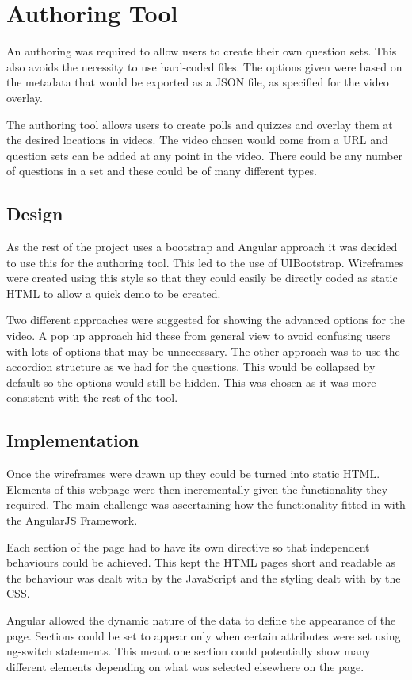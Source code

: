 \chapter{Authoring Tool} 
\label{Chapter:Authoring Tool}
An \gls{authoring} was required to allow users to create their own question sets. This also avoids the necessity to use hard-coded files. The options given were based on the metadata that would be exported as a JSON file, as specified for the video overlay.

The authoring tool allows users to create polls and quizzes and overlay them at the desired locations in videos. The video chosen would come from a URL and question sets can be added at any point in the video. There could be any number of questions in a set and these could be of many different types.
\section{Design} 
\label{Section:Design}
As the rest of the project uses a bootstrap and Angular approach it was decided to use this for the authoring tool. This led to the use of UIBootstrap. Wireframes were created using this style so that they could easily be directly coded as static HTML to allow a quick demo to be created. 

Two different approaches were suggested for showing the advanced options for the video. A pop up approach hid these from general view to avoid confusing users with lots of options that may be unnecessary. The other approach was to use the accordion structure as we had for the questions. This would be collapsed by default so the options would still be hidden. This was chosen as it was more consistent with the rest of the tool.

\section{Implementation}
\label{Section:Implementation}
Once the wireframes were drawn up they could be turned into static HTML. Elements of this webpage were then incrementally given the functionality they required. The main challenge was ascertaining how the functionality fitted in with the \gls{AngularJS} Framework. 

Each section of the page had to have its own directive so that independent behaviours could be achieved. This kept the HTML pages short and readable as the behaviour was dealt with by the JavaScript and the styling dealt with by the \gls{CSS}.

Angular allowed the dynamic nature of the data to define the appearance of the page. Sections could be set to appear only when certain attributes were set using ng-switch statements. This meant one section could potentially show many different elements depending on what was selected elsewhere on the page.